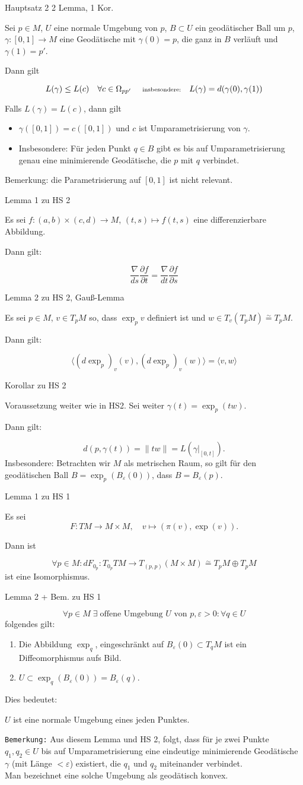 \documentclass[a6paper,11pt,grid=front]{kartei}
\newcommand{\fl}[1]{\begin{flushleft}
 #1 \end{flushleft}}
\newcommand{\eps}{\varepsilon}
\newcounter{def}
\newcounter{satz}
\begin{document}
\nonameyet
{Hauptsatz 2} {\scriptsize 2 Lemma, 1 Kor.}
{
\small
Sei $p\in M$, $U$ eine normale Umgebung von $p$, $B \subset U$ ein 
geodätischer Ball um $p$, $\gamma:[0,1] \to M$ eine Geodätische mit 
$\gamma(0) = p$, die ganz in $B$ verläuft und $\gamma(1) = p'$.
%
\fl{Dann gilt}  
\[
L(\gamma) \leq L(c) \quad \forall c \in \Omega_{pp'}
\quad \text { \scriptsize insbesondere:} \quad 
L(\gamma) = d(\gamma(0),\gamma(1))
\]
\fl{Falls $L(\gamma) = L(c)$, dann gilt }
\begin{itemize}[-]
\item $\gamma([0,1]) = c([0,1])$ und $c$ ist Umparametrisierung von $\gamma$.
\item Insbesondere: Für jeden Punkt $q \in B$ gibt es bis auf Umparametrisierung
genau eine minimierende Geodätische, die $p$ mit $q$ verbindet.
\end{itemize}
Bemerkung: die Parametrisierung auf $[0,1]$ ist nicht relevant.
}
{}

\nonameyet
{Lemma 1} {zu HS 2}
{
Es sei $f: (a,b) \times (c,d) \to M$, $(t,s) \mapsto f(t,s)$ eine 
differenzierbare Abbildung.
\fl{Dann gilt:}
\[
\frac{\nabla}{ds} \frac{\partial f}{\partial t} 
= \frac{\nabla}{dt} \frac{\partial f}{\partial s}
\]	
}
{}

\nonameyet
{Lemma 2} {\small zu HS 2, Gauß-Lemma}
{
Es sei $p\in M$, $v\in T_pM$ so, dass $\exp_p v$ definiert ist
und $w\in T_v (T_p M) \overset{\sim}{=} T_pM$. 

\fl{Dann gilt:}
\[
\langle (d \exp_p)_v (v), (d \exp_p)_v(w) \rangle
= \langle v, w \rangle 
\]
}
{}

\nonameyet
{Korollar} {zu HS 2}
{
Voraussetzung weiter wie in HS2. Sei weiter 
$\gamma(t) = \exp_p(tw)$.
\fl{Dann gilt:}
\[
d(p,\gamma(t)) = \| tw \| = L(\gamma|_{[0,t]}).
\]
Insbesondere: Betrachten wir $M$ als metrischen Raum, so gilt für den
geodätischen Ball $B = \exp_p(B_\eps (0))$, dass $B = B_\eps(p)$.
}
{}


\nonameyet
{Lemma 1} {zu HS 1}
{
Es sei 
\[
F: TM \to M \times M, \quad v \mapsto (\pi(v), \exp(v)).
\]
\fl{Dann ist}
\[
\forall p\in M : dF_{0_p}: T_{0_p}TM \to T_{(p,p)}(M \times M)
\overset{\sim}{=} T_pM \oplus T_pM
\]
ist eine Isomorphismus.
}
{}


\nonameyet
{Lemma 2 + Bem.} {zu HS 1}
{
\small
\[
\forall p \in M \; \exists \; \text{offene Umgebung $U$ von } p, \eps > 0: 
\forall q\in U
\]
folgendes gilt:
\begin{enumerate}[1.]
\item  Die Abbildung $\exp_q$, eingeschränkt auf $B_\eps(0) \subset T_qM$ 
ist ein Diffeomorphismus aufs Bild.
\item $U\subset \exp_q(B_\eps(0)) = B_\eps(q)$.
\end{enumerate}
%
\fl{Dies bedeutet:}
$U$ ist eine normale Umgebung eines jeden Punktes.
\fl{\texttt{Bemerkung:}
Aus diesem Lemma und HS 2, folgt, dass für je zwei Punkte $q_1, q_2 \in U$ 
bis auf Umparametrisierung eine eindeutige minimierende Geodätische 
$\gamma$ (mit Länge $< \eps$) existiert, die $q_1$ und $q_2$
miteinander verbindet.
\\
Man bezeichnet eine solche Umgebung als geodätisch konvex.}
}
{}
\end{document}
